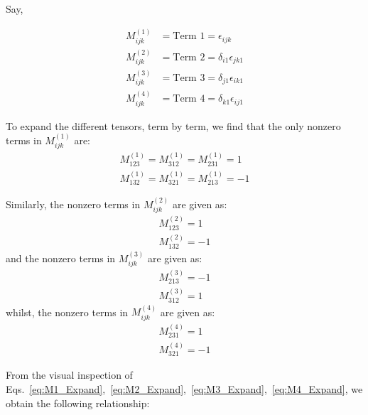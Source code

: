 \documentclass{jfm}
\begin{document}
Say,

\begin{subequations}
\begin{align}
     M_{ijk}^{(1)} &= \text{Term 1} =\epsilon_{ijk} \\
   M_{ijk}^{(2)}   &= \text{Term 2} =\delta_{i1}\epsilon_{jk1} \\
   M_{ijk}^{(3)}   &= \text{Term 3} =\delta_{j1}\epsilon_{ik1} \\
  M_{ijk}^{(4)}   &= \text{Term 4} =\delta_{k1}\epsilon_{ij1} 
\end{align}
\end{subequations}

To expand the different tensors, term by term, we find that the only nonzero terms in  $ M_{ijk}^{(1)} $ are:
\begin{subequations}
\label{eq:M1_Expand}
\begin{align}
   M_{123}^{(1)}  = M_{312}^{(1)} = M_{231}^{(1)} =1 \\
    M_{132}^{(1)}  = M_{321}^{(1)} = M_{213}^{(1)} =-1  
\end{align}
\end{subequations}

Similarly, the nonzero terms in $ M_{ijk}^{(2)} $ are given as:
\begin{subequations}
\label{eq:M2_Expand}
    \begin{align}
         M_{123}^{(2)} =1 \\
         M_{132}^{(2)} =-1
    \end{align}
\end{subequations}
and the nonzero terms in $ M_{ijk}^{(3)} $ are given as:
\begin{subequations}
\label{eq:M3_Expand}
    \begin{align}
        M_{213}^{(3)} = -1 \\
        M_{312}^{(3)} =1
    \end{align}
\end{subequations}
whilst, the nonzero terms in $ M_{ijk}^{(4)} $ are given as:
\begin{subequations}
\label{eq:M4_Expand}
    \begin{align}
        M_{231}^{(4)} = 1 \\
        M_{321}^{(4)} = -1
    \end{align}
\end{subequations}

From the visual inspection of Eqs.~\eqref{eq:M1_Expand},~\eqref{eq:M2_Expand},~\eqref{eq:M3_Expand},~\eqref{eq:M4_Expand}, we obtain the following relationship:
\end{document}
